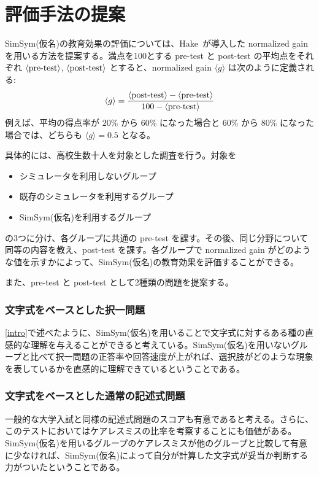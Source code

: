 \documentclass[11pt, a4paper, oneside, twocolumn]{jsarticle}
\newcommand{\simname}{SimSym(仮名)}
\begin{document}
\section{評価手法の提案}
\simname の教育効果の評価については、Hake~\cite{hake_1998}が導入した normalized gain を用いる方法を提案する。満点を100とする pre-test と post-test の平均点をそれぞれ $\langle \textrm{pre\\-test} \rangle$, $\langle \textrm{post\\-test} \rangle$ とすると、normalized gain $\langle g \rangle$ は次のように定義される:
$$ \langle g \rangle = \dfrac{\langle \textrm{post\\-test} \rangle - \langle \textrm{pre\\-test} \rangle}{100 - \langle \textrm{pre\\-test} \rangle} $$
例えば、平均の得点率が $20\%$ から $60\%$ になった場合と $60\%$ から $80\%$ になった場合では、どちらも $\langle g \rangle = 0.5$ となる。

具体的には、高校生数十人を対象とした調査を行う。対象を
\begin{itemize}
  \item {シミュレータを利用しないグループ}
  \item {既存のシミュレータを利用するグループ}
  \item {\simname を利用するグループ}
\end{itemize}
の3つに分け、各グループに共通の pre-test を課す。その後、同じ分野について同等の内容を教え、post-test を課す。各グループで normalized gain がどのような値を示すかによって、\simname の教育効果を評価することができる。

また、pre-test と post-test として2種類の問題を提案する。

\subsubsection*{文字式をベースとした択一問題}
\ref{intro}で述べたように、\simname を用いることで文字式に対するある種の直感的な理解を与えることができると考えている。\simname を用いないグループと比べて択一問題の正答率や回答速度が上がれば、選択肢がどのような現象を表しているかを直感的に理解できているということである。

\subsubsection*{文字式をベースとした通常の記述式問題}
一般的な大学入試と同様の記述式問題のスコアも有意であると考える。さらに、このテストにおいてはケアレスミスの比率を考察することにも価値がある。\simname を用いるグループのケアレスミスが他のグループと比較して有意に少なければ、\simname によって自分が計算した文字式が妥当か判断する力がついたということである。

\subsubsection*{}




\end{document}
